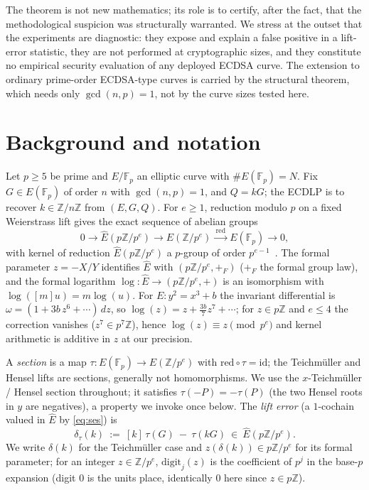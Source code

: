 \documentclass[11pt]{article}
\theoremstyle{definition}
\newcommand{\Fp}{\mathbb{F}_p}
\newcommand{\Z}{\mathbb{Z}}
\newcommand{\Ehat}{\widehat{E}}
\newcommand{\red}{\mathrm{red}}
\begin{document}
The theorem is not new mathematics; its role is to certify, after the
fact, that the methodological suspicion was structurally warranted. We
stress at the outset that the experiments are diagnostic: they expose and
explain a false positive in a lift-error statistic, they are not performed
at cryptographic sizes, and they constitute no empirical security
evaluation of any deployed ECDSA curve. The extension to ordinary
prime-order ECDSA-type curves is carried by the structural theorem, which
needs only $\gcd(n,p)=1$, not by the curve sizes tested here.

\section{Background and notation}\label{sec:background}

Let $p\ge 5$ be prime and $E/\Fp$ an elliptic curve with $\#E(\Fp)=N$.
Fix $G\in E(\Fp)$ of order $n$ with $\gcd(n,p)=1$, and $Q=kG$; the ECDLP
is to recover $k\in\Z/n\Z$ from $(E,G,Q)$. For $e\ge 1$, reduction modulo
$p$ on a fixed Weierstrass lift gives the exact sequence of abelian
groups
\begin{equation}\label{eq:ses}
0 \longrightarrow \Ehat(p\Z/p^e) \longrightarrow E(\Z/p^e)
  \xrightarrow{\ \red\ } E(\Fp) \longrightarrow 0,
\end{equation}
with kernel of reduction $\Ehat(p\Z/p^e)$ a $p$-group of order $p^{e-1}$~\cite{silvermanaec}.
The formal parameter $z=-X/Y$ identifies $\Ehat$ with $(p\Z/p^e,+_F)$
($+_F$ the formal group law), and the formal logarithm
$\log\colon\Ehat\to(p\Z/p^e,+)$ is an isomorphism with
$\log([m]u)=m\log(u)$. For $E\colon y^2=x^3+b$ the invariant differential
is $\omega=(1+3b\,z^6+\cdots)\,dz$, so
$\log(z)=z+\tfrac{3b}{7}z^7+\cdots$; for $z\in p\Z$ and $e\le 4$ the
correction vanishes ($z^7\in p^7\Z$), hence $\log(z)\equiv z\pmod{p^e}$
and kernel arithmetic is additive in $z$ at our precision.

A \emph{section} is a map $\tau\colon E(\Fp)\to E(\Z/p^e)$ with
$\red\circ\tau=\mathrm{id}$; the Teichm\"uller and Hensel lifts are
sections, generally not homomorphisms. We use the $x$-Teichm\"uller /
Hensel section throughout; it satisfies $\tau(-P)=-\tau(P)$ (the two
Hensel roots in $y$ are negatives), a property we invoke once below. The
\emph{lift error} (a $1$-cochain valued in $\Ehat$ by \eqref{eq:ses}) is
\begin{equation}
\delta_\tau(k)\ :=\ [k]\,\tau(G)\ -\ \tau(kG)\ \in\ \Ehat(p\Z/p^e).
\end{equation}
We write $\delta(k)$ for the Teichm\"uller case and
$z(\delta(k))\in p\Z/p^e$ for its formal parameter; for an integer
$z\in\Z/p^e$, $\mathrm{digit}_j(z)$ is the coefficient of $p^j$ in the
base-$p$ expansion (digit $0$ is the units place, identically $0$ here
since $z\in p\Z$).
\end{document}
